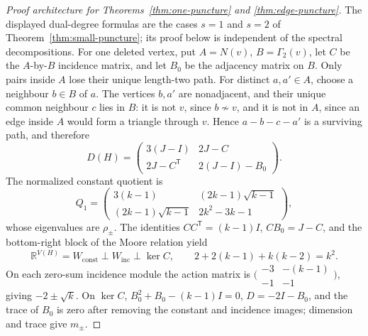 \documentclass[a4paper,10pt,reqno]{amsart}
\theoremstyle{plain}
\theoremstyle{definition}
\theoremstyle{remark}
\begin{document}
\begin{proof}[Proof architecture for Theorems~\ref{thm:one-puncture} and
\ref{thm:edge-puncture}]
The displayed dual-degree formulas are the cases \(s=1\) and \(s=2\) of
Theorem~\ref{thm:small-puncture}; its proof below is independent of the
spectral decompositions.  For one deleted vertex, put \(A=N(v)\),
\(B=\Gamma_2(v)\), let \(C\) be
the \(A\)-by-\(B\) incidence matrix, and let \(B_0\) be the adjacency
matrix on \(B\).  Only pairs inside \(A\) lose their unique length-two path.
For distinct \(a,a'\in A\), choose a neighbour \(b\in B\) of \(a\).  The
vertices \(b,a'\) are nonadjacent, and their unique common neighbour \(c\)
lies in \(B\): it is not \(v\), since \(b\not\sim v\), and it is not in
\(A\), since an edge inside \(A\) would form a triangle through \(v\).
Hence \(a-b-c-a'\) is a surviving path, and therefore
\[
 D(H)=\begin{pmatrix}3(J-I)&2J-C\\2J-C^{\mathsf T}&2(J-I)-B_0\end{pmatrix}.
\]
The normalized constant quotient is
\[
 Q_1=\begin{pmatrix}
 3(k-1)&(2k-1)\sqrt{k-1}\\
 (2k-1)\sqrt{k-1}&2k^2-3k-1
 \end{pmatrix},
\]
whose eigenvalues are \(\rho_\pm\).  The identities
\(CC^{\mathsf T}=(k-1)I\), \(CB_0=J-C\), and the bottom-right block of the
Moore relation yield
\[
 \mathbb R^{V(H)}=W_{\mathrm{const}}\perp W_{\mathrm{inc}}\perp\ker C,
 \qquad 2+2(k-1)+k(k-2)=k^2.
\]
On each zero-sum incidence module the action matrix is
\(\bigl(\begin{smallmatrix}-3&-(k-1)\\-1&-1\end{smallmatrix}\bigr)\),
giving \(-2\pm\sqrt{k}\).  On \(\ker C\),
\(B_0^2+B_0-(k-1)I=0\), \(D=-2I-B_0\), and the trace of \(B_0\) is
zero after removing the constant and incidence images; dimension and trace give
\(m_\pm\).


\end{proof}
\end{document}
